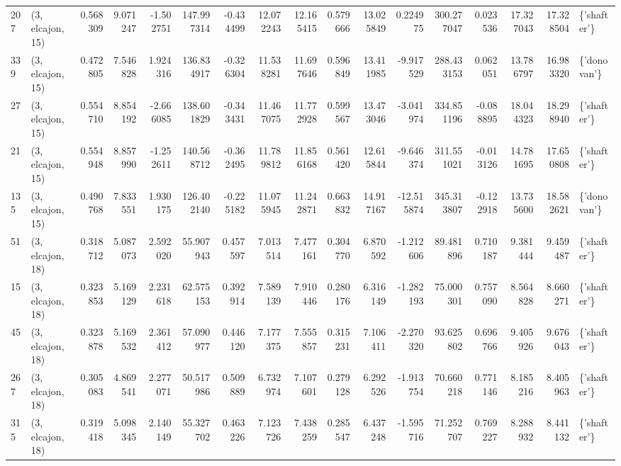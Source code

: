 \begin{tabular}{llrrrrrrrrrrrrrrl}
207 &  (3, elcajon, 15) &   0.568309 &   9.071247 &  -1.502751 &   147.997314 &  -0.434499 &  12.072243 &  12.165415 &  0.579666 &  13.025849 &   0.224975 &   300.277047 &   0.023536 &  17.327043 &  17.328504 &  \{'shafter'\} \\
339 &  (3, elcajon, 15) &   0.472805 &   7.546828 &   1.924316 &   136.834917 &  -0.326304 &  11.538281 &  11.697646 &  0.596849 &  13.411985 &  -9.917529 &   288.433153 &   0.062051 &  13.786797 &  16.983320 &  \{'donovan'\} \\
27  &  (3, elcajon, 15) &   0.554710 &   8.854192 &  -2.666085 &   138.601829 &  -0.343431 &  11.467075 &  11.772928 &  0.599567 &  13.473046 &  -3.041974 &   334.851196 &  -0.088895 &  18.044323 &  18.298940 &  \{'shafter'\} \\
21  &  (3, elcajon, 15) &   0.554948 &   8.857990 &  -1.252611 &   140.568712 &  -0.362495 &  11.789812 &  11.856168 &  0.561420 &  12.615844 &  -9.646374 &   311.551021 &  -0.013126 &  14.781695 &  17.650808 &  \{'shafter'\} \\
135 &  (3, elcajon, 15) &   0.490768 &   7.833551 &   1.930175 &   126.402140 &  -0.225182 &  11.075945 &  11.242871 &  0.663832 &  14.917167 & -12.515874 &   345.313807 &  -0.122918 &  13.735600 &  18.582621 &  \{'donovan'\} \\
51  &  (3, elcajon, 18) &   0.318712 &   5.087073 &   2.592020 &    55.907943 &   0.457597 &   7.013514 &   7.477161 &  0.304770 &   6.870592 &  -1.212606 &    89.481896 &   0.710187 &   9.381444 &   9.459487 &  \{'shafter'\} \\
15  &  (3, elcajon, 18) &   0.323853 &   5.169129 &   2.231618 &    62.575153 &   0.392914 &   7.589139 &   7.910446 &  0.280176 &   6.316149 &  -1.282193 &    75.000301 &   0.757090 &   8.564828 &   8.660271 &  \{'shafter'\} \\
45  &  (3, elcajon, 18) &   0.323878 &   5.169532 &   2.361412 &    57.090977 &   0.446120 &   7.177375 &   7.555857 &  0.315231 &   7.106411 &  -2.270320 &    93.625802 &   0.696766 &   9.405926 &   9.676043 &  \{'shafter'\} \\
267 &  (3, elcajon, 18) &   0.305083 &   4.869541 &   2.277071 &    50.517986 &   0.509889 &   6.732974 &   7.107601 &  0.279128 &   6.292526 &  -1.913754 &    70.660218 &   0.771146 &   8.185216 &   8.405963 &  \{'shafter'\} \\
315 &  (3, elcajon, 18) &   0.319418 &   5.098345 &   2.140149 &    55.327702 &   0.463226 &   7.123726 &   7.438259 &  0.285547 &   6.437248 &  -1.595716 &    71.252707 &   0.769227 &   8.288932 &   8.441132 &  \{'shafter'\} \\

\end{tabular}
